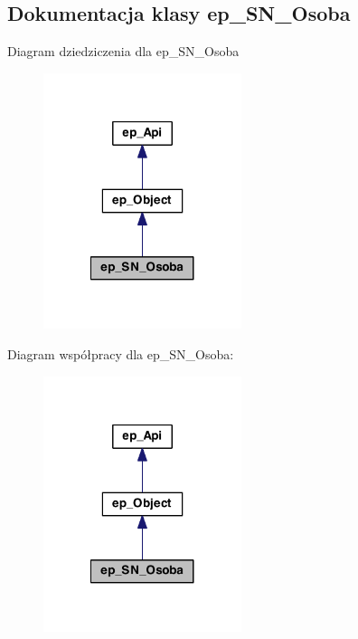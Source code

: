 \hypertarget{classep___s_n___osoba}{\subsection{Dokumentacja klasy ep\-\_\-\-S\-N\-\_\-\-Osoba}
\label{classep___s_n___osoba}
}


Diagram dziedziczenia dla ep\-\_\-\-S\-N\-\_\-\-Osoba\nopagebreak
\begin{figure}[H]
\begin{center}
\leavevmode
\includegraphics[width=164pt]{classep___s_n___osoba__inherit__graph}
\end{center}
\end{figure}


Diagram współpracy dla ep\-\_\-\-S\-N\-\_\-\-Osoba\-:\nopagebreak
\begin{figure}[H]
\begin{center}
\leavevmode
\includegraphics[width=164pt]{classep___s_n___osoba__coll__graph}
\end{center}
\end{figure}
